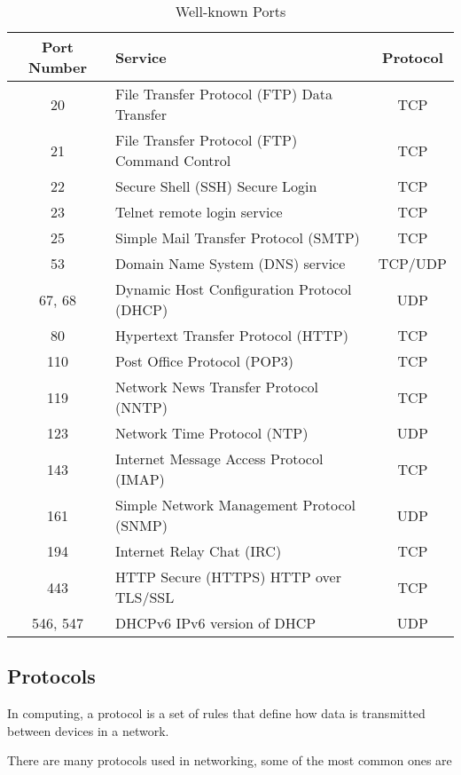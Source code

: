 \begin{table*}[h!]
\caption{Well-known Ports}
\begin{tabular}{c l c}
\toprule
Port Number & Service & Protocol \\
\midrule
20 & File Transfer Protocol (FTP) Data Transfer & TCP \\
21 & File Transfer Protocol (FTP) Command Control & TCP \\
22 & Secure Shell (SSH) Secure Login & TCP \\
23 & Telnet remote login service& TCP \\
25 & Simple Mail Transfer Protocol (SMTP)& TCP \\
53 & Domain Name System (DNS) service & TCP/UDP \\
67, 68 & Dynamic Host Configuration Protocol (DHCP) & UDP \\
80 & Hypertext Transfer Protocol (HTTP) & TCP \\
110 & Post Office Protocol (POP3) & TCP \\
119 & Network News Transfer Protocol (NNTP) & TCP \\
123 & Network Time Protocol (NTP) & UDP \\
143 & Internet Message Access Protocol (IMAP) & TCP \\
161 & Simple Network Management Protocol (SNMP) & UDP \\
194 & Internet Relay Chat (IRC) & TCP \\
443 & HTTP Secure (HTTPS) HTTP over TLS/SSL & TCP \\
546, 547 & DHCPv6 IPv6 version of DHCP & UDP \\
\bottomrule
\end{tabular}
\end{table*}

\subsection{Protocols}

\begin{definition}[Protocols]
In computing, a protocol is a set of rules that define
how data is transmitted between devices in a network.
\end{definition}

There are many protocols used in networking, some of
the most common ones are

